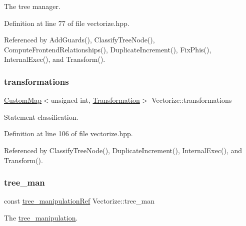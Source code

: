 The tree manager. 



Definition at line 77 of file vectorize.\+hpp.



Referenced by Add\+Guards(), Classify\+Tree\+Node(), Compute\+Frontend\+Relationships(), Duplicate\+Increment(), Fix\+Phis(), Internal\+Exec(), and Transform().

\mbox{\label{classVectorize_a6dde3b3f2f317c29b924ed156f940f59}} 
\subsubsection{\texorpdfstring{transformations}{transformations}}
{\footnotesize\ttfamily \hyperlink{custom__map_8hpp_a18ca01763abbe3e5623223bfe5aaac6b}{Custom\+Map}$<$unsigned int, \hyperlink{vectorize_8hpp_a0176e2f61ce5ea7a3495a511cf46b2c1}{Transformation}$>$ Vectorize\+::transformations\hspace{0.3cm}{\ttfamily [private]}}



Statement classification. 



Definition at line 106 of file vectorize.\+hpp.



Referenced by Classify\+Tree\+Node(), Duplicate\+Increment(), Internal\+Exec(), and Transform().

\mbox{\label{classVectorize_a2f6a50c2c425d62e05eddd680be94af7}} 
\subsubsection{\texorpdfstring{tree\+\_\+man}{tree\_man}}
{\footnotesize\ttfamily const \hyperlink{tree__manipulation_8hpp_a1a9460e3a2f9fc6a96cfd2f24cc9b2a5}{tree\+\_\+manipulation\+Ref} Vectorize\+::tree\+\_\+man\hspace{0.3cm}{\ttfamily [private]}}



The \hyperlink{classtree__manipulation}{tree\+\_\+manipulation}. 



